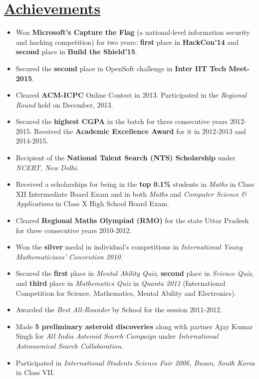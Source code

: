 \documentclass[8pt]{extarticle}
\newcommand{\heading}[1]{
\section*{\color{red}\underline{#1}}
}
\begin{document}
\heading{Achievements}

\begin{itemize}
\item Won \textbf{Microsoft's Capture the Flag} (a national-level information security and hacking competition) for two years: \textbf{first} place in \textbf{HackCon'14} and \textbf{second} place in \textbf{Build the Shield'15}.

\item Secured the \textbf{second} place in OpenSoft challenge in \textbf{Inter IIT Tech Meet-2015}.

\item Cleared \textbf{ACM-ICPC} Online Contest in 2013. Participated in the \textit{Regional Round} held on December, 2013.

\item Secured the \textbf{highest CGPA} in the batch for three consecutive years 2012-2015. Received the \textbf{Academic Excellence Award} for it in 2012-2013 and 2014-2015.

\item Recipient of the \textbf{National Talent Search (NTS) Scholarship} under \textit{NCERT, New Delhi}.

\item Received a scholarships for being in the \textbf{top 0.1\%} students in \textit{Maths} in Class XII Intermediate Board Exam and in both \textit{Maths} and \textit{Computer Science \& Applications} in Class X High School Board Exam.

\item Cleared \textbf{Regional Maths Olympiad (RMO)} for the state Uttar Pradesh for three consecutive years 2010-2012.

\item Won the \textbf{silver} medal in individual’s competitions in \textit{International Young Mathematicians’ Convention 2010}.

\item Secured the \textbf{first} place in \textit{Mental Ability Quiz}, \textbf{second} place in \textit{Science Quiz}, and \textbf{third} place in \textit{Mathematics Quiz} in \textit{Quanta 2011} (International Competition for Science, Mathematics, Mental Ability and Electronics).

\item Awarded the \textit{Best All-Rounder} by School for the session 2011-2012.
\item Made \textbf{5 preliminary asteroid discoveries} along with partner Ajay Kumar Singh for \textit{All India Asteroid Search Campaign} under \textit{International Astronomical Search Collaboration}.

\item Participated in \textit{International Students Science Fair 2006, Busan, South Korea} in Class VII.
\end{itemize}
\end{document}
